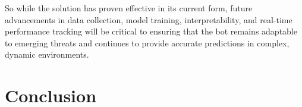 So while the solution has proven effective in its current form, future advancements in data collection, model training, interpretability, and real-time performance tracking will be critical to ensuring that the bot remains adaptable to emerging threats and continues to provide accurate predictions in complex, dynamic environments.

\section{Conclusion}
